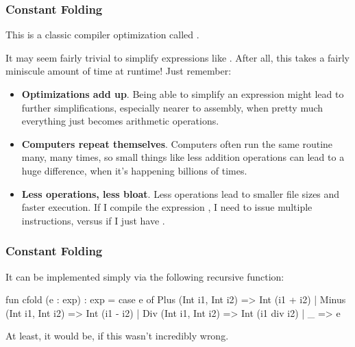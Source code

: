 \documentclass[aspectratio=169]{beamer}
\begin{document}
\begin{frame}[fragile]
  \frametitle{Constant Folding}

  This is a classic compiler optimization called .

  \pause
  \vspace{\fill}


  \pause
  \vspace{\fill}

  It may seem fairly trivial to simplify expressions like . After
  all, this takes a fairly miniscule amount of time at runtime! Just remember:
  \pause
  \begin{itemize}
    \item \textbf{Optimizations add up}. Being able to simplify an expression
    might lead to further simplifications, especially nearer to
    assembly, when pretty much everything just becomes arithmetic operations. \pause
    \item \textbf{Computers repeat themselves}. Computers often run the same routine many, many times, so small
    things like less addition operations can lead to a huge difference, when
    it's happening billions of times. \pause
    \item \textbf{Less operations, less bloat}. Less operations lead to smaller file
    sizes and faster execution. If I compile the expression , I need to issue
    multiple instructions, versus if I just have .
  \end{itemize}
\end{frame}

\begin{frame}[fragile]
  \frametitle{Constant Folding}

  It can be implemented simply via the following recursive function:

  \pause
  {\small
  \begin{codeblock}
    fun cfold (e : exp) : exp =
      case e of
        Plus  (Int i1, Int i2) => Int (i1 + i2)
      | Minus (Int i1, Int i2) => Int (i1 - i2)
      | Div   (Int i1, Int i2) => Int (i1 div i2)
      | _ => e
  \end{codeblock}
  }

  \pause
  \vspace{\fill}

  At least, it would be, if this wasn't incredibly wrong.
\end{frame}
\end{document}
